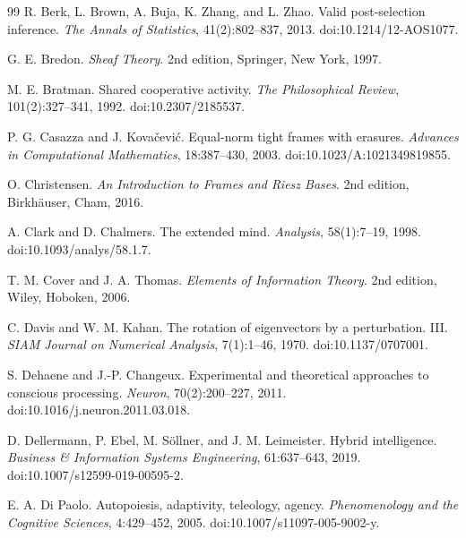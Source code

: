 \documentclass[11pt,oneside,openany]{book}
\numberwithin{equation}{section}
\begin{document}
\begin{thebibliography}{99}
R. Berk, L. Brown, A. Buja, K. Zhang, and L. Zhao.
\newblock Valid post-selection inference.
\newblock \emph{The Annals of Statistics}, 41(2):802--837, 2013.
\newblock doi:10.1214/12-AOS1077.

G. E. Bredon.
\newblock \emph{Sheaf Theory}.
\newblock 2nd edition, Springer, New York, 1997.

M. E. Bratman.
\newblock Shared cooperative activity.
\newblock \emph{The Philosophical Review}, 101(2):327--341, 1992.
\newblock doi:10.2307/2185537.

P. G. Casazza and J. Kova\v{c}evi\'c.
\newblock Equal-norm tight frames with erasures.
\newblock \emph{Advances in Computational Mathematics}, 18:387--430, 2003.
\newblock doi:10.1023/A:1021349819855.

O. Christensen.
\newblock \emph{An Introduction to Frames and Riesz Bases}.
\newblock 2nd edition, Birkh\"auser, Cham, 2016.

A. Clark and D. Chalmers.
\newblock The extended mind.
\newblock \emph{Analysis}, 58(1):7--19, 1998.
\newblock doi:10.1093/analys/58.1.7.

T. M. Cover and J. A. Thomas.
\newblock \emph{Elements of Information Theory}.
\newblock 2nd edition, Wiley, Hoboken, 2006.

C. Davis and W. M. Kahan.
\newblock The rotation of eigenvectors by a perturbation. III.
\newblock \emph{SIAM Journal on Numerical Analysis}, 7(1):1--46, 1970.
\newblock doi:10.1137/0707001.

S. Dehaene and J.-P. Changeux.
\newblock Experimental and theoretical approaches to conscious processing.
\newblock \emph{Neuron}, 70(2):200--227, 2011.
\newblock doi:10.1016/j.neuron.2011.03.018.

D. Dellermann, P. Ebel, M. S\"ollner, and J. M. Leimeister.
\newblock Hybrid intelligence.
\newblock \emph{Business \& Information Systems Engineering}, 61:637--643, 2019.
\newblock doi:10.1007/s12599-019-00595-2.

E. A. Di Paolo.
\newblock Autopoiesis, adaptivity, teleology, agency.
\newblock \emph{Phenomenology and the Cognitive Sciences}, 4:429--452, 2005.
\newblock doi:10.1007/s11097-005-9002-y.


\end{thebibliography}
\end{document}
